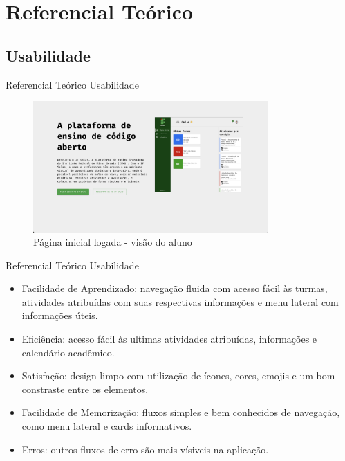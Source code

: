 \AtBeginSection[]{
	\begin{frame}
		\frametitle{}
		\tableofcontents[currentsection]
	\end{frame}
}

\section{Referencial Teórico}

\subsection{Usabilidade}
\begin{frame}{Referencial Teórico}
	{Usabilidade}
	\begin{figure}
		\includegraphics[width=9cm]{images/if-salas-pagina.png}
		\caption{Página inicial logada - visão do aluno}
	\end{figure}
\end{frame}

\begin{frame}{Referencial Teórico}
	{Usabilidade}
	\begin{itemize}[<+->]
		\item Facilidade de Aprendizado: navegação fluida com acesso fácil às turmas, atividades atribuídas com suas respectivas informações e menu lateral com informações úteis.
		\item Eficiência: acesso fácil às ultimas atividades atribuídas, informações e calendário acadêmico.
		\item Satisfação: design limpo com utilização de ícones, cores, emojis e um bom constraste entre os elementos.
		\item Facilidade de Memorização: fluxos simples e bem conhecidos de navegação, como menu lateral e cards informativos.
		\item Erros: outros fluxos de erro são mais vísiveis na aplicação.
	\end{itemize}
\end{frame}

